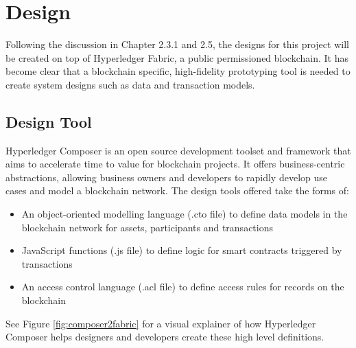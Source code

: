 \chapter{Design}
\graphicspath{{Chapter5/Figs/Raster/}{Chapter5/Figs/}}

Following the discussion in Chapter 2.3.1 and 2.5, the designs for this project 
will be created on top of Hyperledger Fabric, a public permissioned blockchain.
It has become clear that a blockchain specific, high-fidelity prototyping tool is needed 
to create system designs such as data and transaction models.

\section{Design Tool}

Hyperledger Composer is an open source development toolset and framework that aims to 
accelerate time to value for blockchain projects. It offers business-centric 
abstractions, allowing business owners and developers to rapidly develop 
use cases and model a blockchain network. The design tools offered take the forms of:
\begin{itemize}
    \setlength\itemsep{0em}            
    \item An object-oriented modelling language (.cto file) to define data models in 
    the blockchain network for assets, participants and transactions
    \item JavaScript functions (.js file) to define logic for smart contracts triggered by transactions
    \item An access control language (.acl file) to define access rules for records on the blockchain\\
    \citep{official2018composer}
\end{itemize}

See Figure \ref{fig:composer2fabric} for a visual explainer of how Hyperledger Composer 
helps designers and developers create these high level definitions.

